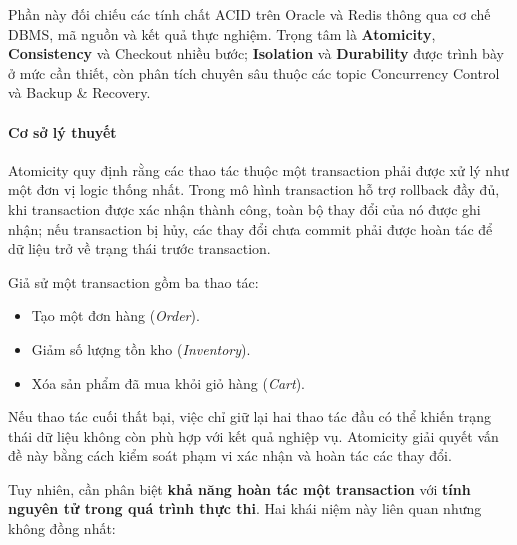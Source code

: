 \label{sec:tx-2}
Phần này đối chiếu các tính chất ACID trên Oracle và Redis thông qua cơ chế DBMS, mã nguồn và kết quả thực nghiệm. Trọng tâm là \textbf{Atomicity}, \textbf{Consistency} và Checkout nhiều bước; \textbf{Isolation} và \textbf{Durability} được trình bày ở mức cần thiết, còn phân tích chuyên sâu thuộc các topic Concurrency Control và Backup \& Recovery.

\label{sec:tx-2-1}
\paragraph*{Cơ sở lý thuyết}

Atomicity quy định rằng các thao tác thuộc một transaction phải được xử lý như một đơn vị logic thống nhất. Trong mô hình transaction hỗ trợ rollback đầy đủ, khi transaction được xác nhận thành công, toàn bộ thay đổi của nó được ghi nhận; nếu transaction bị hủy, các thay đổi chưa commit phải được hoàn tác để dữ liệu trở về trạng thái trước transaction.

Giả sử một transaction gồm ba thao tác:

\begin{itemize}[leftmargin=*,itemsep=2pt,topsep=4pt]
\item
Tạo một đơn hàng (\emph{Order}).

\item
Giảm số lượng tồn kho (\emph{Inventory}).

\item
Xóa sản phẩm đã mua khỏi giỏ hàng (\emph{Cart}).

\end{itemize}
Nếu thao tác cuối thất bại, việc chỉ giữ lại hai thao tác đầu có thể khiến trạng thái dữ liệu không còn phù hợp với kết quả nghiệp vụ. Atomicity giải quyết vấn đề này bằng cách kiểm soát phạm vi xác nhận và hoàn tác các thay đổi.

Tuy nhiên, cần phân biệt \textbf{khả năng hoàn tác một transaction} với \textbf{tính nguyên tử trong quá trình thực thi}. Hai khái niệm này liên quan nhưng không đồng nhất:

